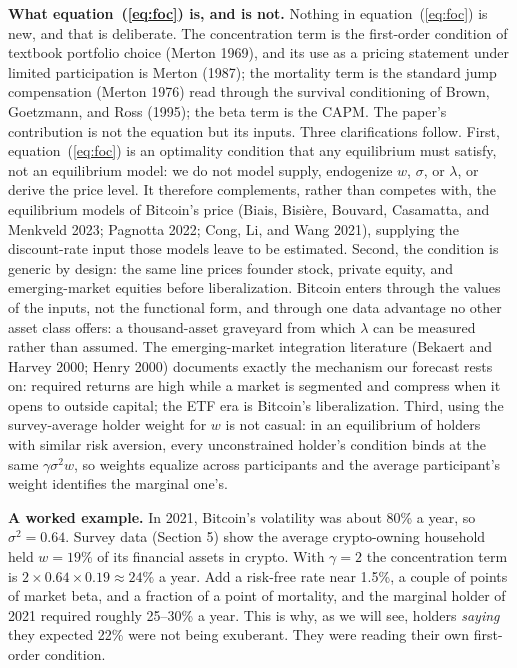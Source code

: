 \documentclass[11pt]{article}
\begin{document}
\textbf{What equation~(\ref{eq:foc}) is, and is not.} Nothing in equation~(\ref{eq:foc}) is new, and that is deliberate. The concentration term is the first-order condition of textbook portfolio choice (Merton 1969), and its use as a pricing statement under limited participation is Merton (1987); the mortality term is the standard jump compensation (Merton 1976) read through the survival conditioning of Brown, Goetzmann, and Ross (1995); the beta term is the CAPM. The paper's contribution is not the equation but its inputs. Three clarifications follow. First, equation~(\ref{eq:foc}) is an optimality condition that any equilibrium must satisfy, not an equilibrium model: we do not model supply, endogenize $w$, $\sigma$, or $\lambda$, or derive the price level. It therefore complements, rather than competes with, the equilibrium models of Bitcoin's price (Biais, Bisi\`ere, Bouvard, Casamatta, and Menkveld 2023; Pagnotta 2022; Cong, Li, and Wang 2021), supplying the discount-rate input those models leave to be estimated. Second, the condition is generic by design: the same line prices founder stock, private equity, and emerging-market equities before liberalization. Bitcoin enters through the values of the inputs, not the functional form, and through one data advantage no other asset class offers: a thousand-asset graveyard from which $\lambda$ can be measured rather than assumed. The emerging-market integration literature (Bekaert and Harvey 2000; Henry 2000) documents exactly the mechanism our forecast rests on: required returns are high while a market is segmented and compress when it opens to outside capital; the ETF era is Bitcoin's liberalization. Third, using the survey-average holder weight for $w$ is not casual: in an equilibrium of holders with similar risk aversion, every unconstrained holder's condition binds at the same $\gamma\sigma^2 w$, so weights equalize across participants and the average participant's weight identifies the marginal one's.

\textbf{A worked example.} In 2021, Bitcoin's volatility was about 80\% a year, so $\sigma^2 = 0.64$. Survey data (Section 5) show the average crypto-owning household held $w = 19\%$ of its financial assets in crypto. With $\gamma = 2$ the concentration term is $2 \times 0.64 \times 0.19 \approx 24\%$ a year. Add a risk-free rate near 1.5\%, a couple of points of market beta, and a fraction of a point of mortality, and the marginal holder of 2021 required roughly 25--30\% a year. This is why, as we will see, holders \emph{saying} they expected 22\% were not being exuberant. They were reading their own first-order condition.
\end{document}
